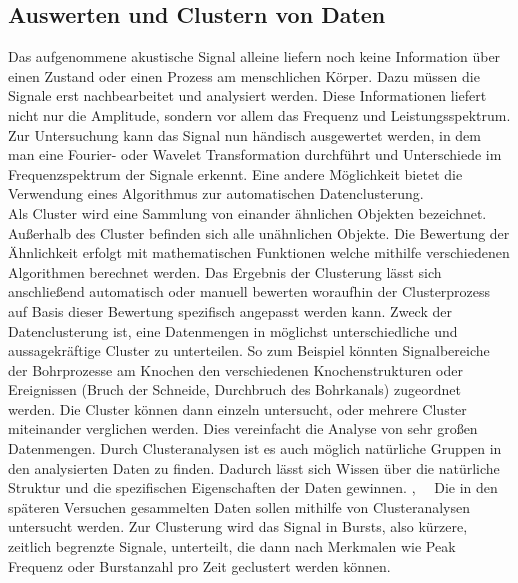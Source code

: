 \documentclass[twoside, 12pt, a4paper]{article}
\begin{document}
	
	
 	\newpage
	
	
	\subsection{Auswerten und Clustern von Daten}
	
	Das aufgenommene akustische Signal alleine liefern noch keine Information \"uber einen Zustand oder einen Prozess am menschlichen K\"orper. Dazu m\"ussen die Signale erst nachbearbeitet und analysiert werden. Diese Informationen liefert nicht nur die Amplitude, sondern vor allem das Frequenz und Leistungsspektrum. Zur Untersuchung kann das Signal nun \grqq{}h\"andisch\grqq{} ausgewertet werden, in dem man eine Fourier- oder Wavelet Transformation durchf\"uhrt und Unterschiede im Frequenzspektrum der Signale erkennt. Eine andere M\"oglichkeit bietet die Verwendung eines Algorithmus zur automatischen Datenclusterung.\\
	Als Cluster wird eine Sammlung von einander \"ahnlichen Objekten bezeichnet. Au{\ss}erhalb des Cluster befinden sich alle un\"ahnlichen Objekte. Die Bewertung der \"Ahnlichkeit erfolgt mit mathematischen Funktionen welche mithilfe verschiedenen Algorithmen berechnet werden. Das Ergebnis der Clusterung l\"asst sich anschlie{\ss}end automatisch oder manuell bewerten woraufhin der Clusterprozess auf Basis dieser Bewertung spezifisch angepasst werden kann. Zweck der  Datenclusterung ist, eine Datenmengen in m\"oglichst unterschiedliche und aussagekr\"aftige Cluster zu  unterteilen. So zum Beispiel k\"onnten Signalbereiche der Bohrprozesse am Knochen den verschiedenen Knochenstrukturen oder Ereignissen (Bruch der Schneide, Durchbruch des Bohrkanals) zugeordnet werden. Die Cluster k\"onnen dann einzeln untersucht, oder mehrere Cluster miteinander verglichen werden. Dies vereinfacht die Analyse von sehr gro{\ss}en Datenmengen. Durch Clusteranalysen ist es auch m\"oglich nat\"urliche Gruppen in den analysierten Daten zu finden. Dadurch l\"asst sich Wissen \"uber die nat\"urliche Struktur und die spezifischen Eigenschaften der Daten gewinnen. \cite{CanOnder.15.01.2004},~\cite{PhilipPlohn.2014}~ Die in den sp\"ateren Versuchen gesammelten Daten sollen mithilfe von Clusteranalysen untersucht werden. Zur Clusterung wird das Signal in Bursts, also k\"urzere, zeitlich begrenzte Signale, unterteilt, die dann nach Merkmalen wie Peak Frequenz oder Burstanzahl pro Zeit geclustert werden k\"onnen. 
	
	
\end{document}
